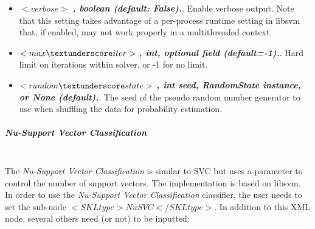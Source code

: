 \begin{itemize}
  \item $<verbose>$ \textbf{\textit{, boolean (default: False).}}. Enable verbose output. Note that this setting takes advantage of a per-process runtime setting in libsvm that, if enabled, may not work properly in a multithreaded context.
  \item $<max\textunderscore iter>$ \textbf{\textit{, int, optional field (default=-1).}}. Hard limit on iterations within solver, or -1 for no limit.
  \item $<random\textunderscore state>$ \textbf{\textit{, int seed, RandomState instance, or None (default).}}. The seed of the pseudo random number generator to use when shuffling the data for probability estimation.
\end{itemize}

\subparagraph{Nu-Support Vector Classification}
\mbox{}
\\The \textit{Nu-Support Vector Classification} is similar to SVC but uses a parameter to control the number of support vectors.
The implementation is based on libsvm.
\\In order to use the \textit{Nu-Support Vector Classification} classifier, the user needs to set the sub-node $<SKLtype>NuSVC</SKLtype>$.
In addition to this XML node, several others need (or not) to be inputted:
